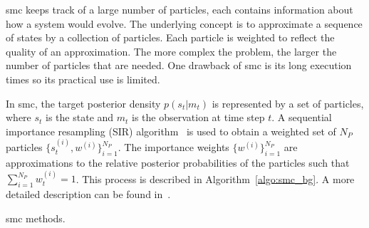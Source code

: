 \gls{smc} keeps track of a large number of particles, each contains information about how a system would evolve.
The underlying concept is to approximate a sequence of states by a collection of particles.
Each particle is weighted to reflect the quality of an approximation.
The more complex the problem, the larger the number of particles that are needed.
One drawback of \gls{smc} is its long execution times so its practical use is limited.

In \gls{smc}, the target posterior density $p(s_t|m_t)$ is represented by a set of particles, where $s_t$ is the state and $m_t$ is the observation at time step $t$.
A sequential importance resampling (SIR) algorithm~\cite{gordon93} is used to obtain a weighted set of $N_P$ particles $\{s_t^{(i)},w^{(i)}\}^{N_P}_{i=1}$.
The importance weights $\{w^{(i)}\}^{N_P}_{i=1}$ are approximations to the relative posterior probabilities of the particles such that $\sum^{N_P}_{i=1}w^{(i)}_t = 1$.
This process is described in Algorithm~\ref{algo:smc_bg}.
A more detailed description can be found in~\cite{doucet01}. 

\begin{algorithm}
\caption{\gls{smc} methods.}
\begin{algorithmic}[1]
			 \label{algo:s}
			 \label{algo:i}
		\ENDWHILE
	\ENDFOR
	\ENDIF
\ENDWHILE
{}
\ENDFOR
\end{algorithmic}
\label{algo:smc_bg}
\end{algorithm}

